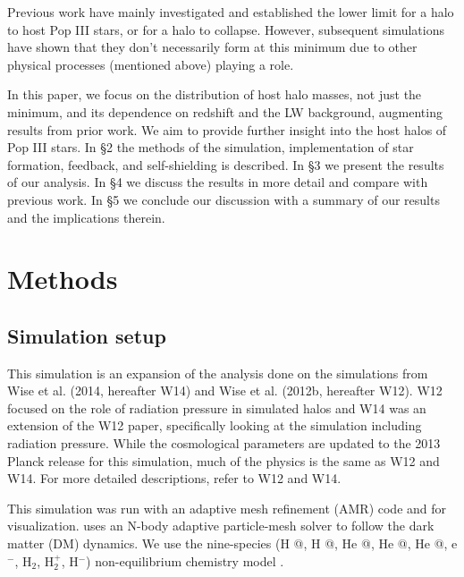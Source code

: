\documentclass[a4paper,fleqn,usenatbib]{mnras}
\makeatletter
\newcommand*{\rom}[1]{\expandafter\@slowromancap\romannumeral #1@}
\makeatother
\begin{document}
Previous work have mainly investigated and established the lower limit for a halo to host Pop III stars, or for a halo to collapse. However, subsequent simulations have shown that they don't necessarily form at this minimum due to other physical processes (mentioned above) playing a role.

In this paper, we focus on the distribution of host halo masses, not just the minimum, and its dependence on redshift and the LW background, augmenting results from prior work. We aim to provide further insight into the host halos of Pop III stars. In \S 2 the methods of the simulation, implementation of star formation, feedback, and \hh{} self-shielding is described. In \S 3 we present the results of our analysis. In \S 4 we discuss the results in more detail and compare with previous work. In \S 5 we conclude our discussion with a summary of our results and the implications therein.

\section{Methods}
\subsection{Simulation setup}
This simulation is an expansion of the analysis done on the 
simulations from Wise et al. (2014, hereafter W14) and Wise et al. 
(2012b, hereafter W12). W12 focused on the role of radiation pressure in simulated halos and W14 was an extension of the W12 paper, specifically looking at the simulation including radiation pressure. While the cosmological parameters are updated to the 2013 Planck release \citet{Planck13_Cosmo} for this simulation, much of the physics is the same as W12 and W14. For more detailed descriptions, refer to W12 and W14.

This simulation was run with an adaptive mesh refinement (AMR) code 
\enzo{} \citep{Enzo} and \yt{} \citep{yt_full_paper} for visualization. \enzo{} uses an N-body adaptive particle-mesh solver \citep{Efstathiou85, Couchman91, BryanNorman1997} to follow the dark matter (DM) dynamics. We use the nine-species (H \rom{1}, H \rom{2}, He \rom{1}, He \rom{2}, He \rom{3}, e$^{-}$, H$_{2}$, H$_{2}^{+}$, H$^{-}$) non-equilibrium chemistry model \citep{Abel97, Anninos97}. 
\end{document}
